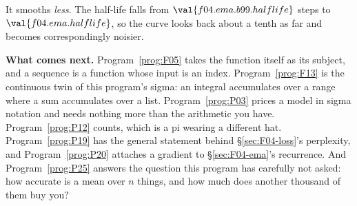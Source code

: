 \begin{fr}
\begin{ansblock}
It smooths \emph{less}. The half-life falls from
$\val{f04.ema.b99.halflife}$ steps to $\val{f04.ema.halflife}$, so the curve
looks back about a tenth as far and becomes correspondingly noisier.
\end{ansblock}

\medskip
\noindent
\textbf{What comes next.} Program~\ref{prog:F05} takes the function itself as
its subject, and a sequence is a function whose input is an index.
Program~\ref{prog:F13} is the continuous twin of this program's sigma: an
integral accumulates over a range where a sum accumulates over a list.
Program~\ref{prog:P03} prices a model in sigma notation and needs nothing more
than the arithmetic you have. Program~\ref{prog:P12} counts, which is a pi
wearing a different hat. Program~\ref{prog:P19} has the general statement
behind \S\ref{sec:F04-loss}'s perplexity, and Program~\ref{prog:P20} attaches
a gradient to \S\ref{sec:F04-ema}'s recurrence. And
Program~\ref{prog:P25} answers the question this program has carefully not
asked: how accurate is a mean over $n$ things, and how much does another
thousand of them buy you?
\end{fr}

